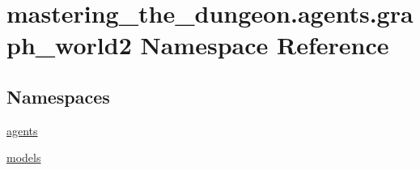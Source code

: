 \hypertarget{namespacemastering__the__dungeon_1_1agents_1_1graph__world2}{}\section{mastering\+\_\+the\+\_\+dungeon.\+agents.\+graph\+\_\+world2 Namespace Reference}
\label{namespacemastering__the__dungeon_1_1agents_1_1graph__world2}
\subsection*{Namespaces}
\begin{DoxyCompactItemize}
\item 
 \hyperlink{namespacemastering__the__dungeon_1_1agents_1_1graph__world2_1_1agents}{agents}
\item 
 \hyperlink{namespacemastering__the__dungeon_1_1agents_1_1graph__world2_1_1models}{models}
\end{DoxyCompactItemize}
